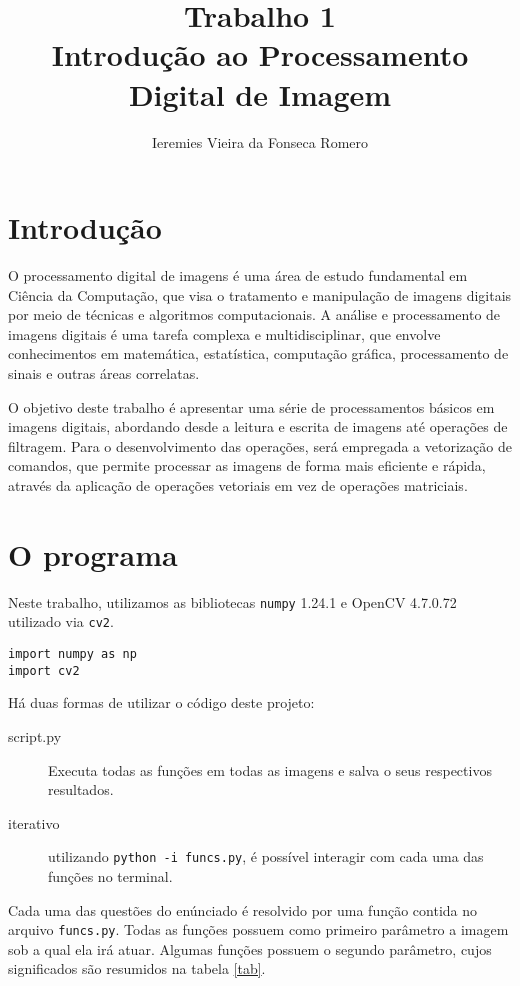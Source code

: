 \documentclass[11pt]{article}
\author{Ieremies Vieira da Fonseca Romero}
\date{}
\title{Trabalho 1\\\medskip
\large Introdução ao Processamento Digital de Imagem}
\begin{document}
\maketitle

\section*{Introdução}
\label{sec:orgb205600}
O processamento digital de imagens é uma área de estudo fundamental em Ciência da Computação, que visa o tratamento e manipulação de imagens digitais por meio de técnicas e algoritmos computacionais.
A análise e processamento de imagens digitais é uma tarefa complexa e multidisciplinar, que envolve conhecimentos em matemática, estatística, computação gráfica, processamento de sinais e outras áreas correlatas.

O objetivo deste trabalho é apresentar uma série de processamentos básicos em imagens digitais, abordando desde a leitura e escrita de imagens até operações de filtragem.
Para o desenvolvimento das operações, será empregada a vetorização de comandos, que permite processar as imagens de forma mais eficiente e rápida, através da aplicação de operações vetoriais em vez de operações matriciais.

\section*{O programa}
\label{sec:org1bb1d2f}
Neste trabalho, utilizamos as bibliotecas \texttt{numpy} 1.24.1 e OpenCV 4.7.0.72 utilizado via \texttt{cv2}.
\begin{verbatim}
import numpy as np
import cv2
\end{verbatim}

Há duas formas de utilizar o código deste projeto:
\begin{description}
\item[{script.py}] Executa todas as funções em todas as imagens e salva o seus respectivos resultados.
\item[{iterativo}] utilizando \texttt{python -i funcs.py}, é possível interagir com cada uma das funções no terminal.
\end{description}

Cada uma das questões do enúnciado é resolvido por uma função contida no arquivo \texttt{funcs.py}.
Todas as funções possuem como primeiro parâmetro a imagem sob a qual ela irá atuar.
Algumas funções possuem o segundo parâmetro, cujos significados são resumidos na tabela \ref{tab}.
\end{document}
